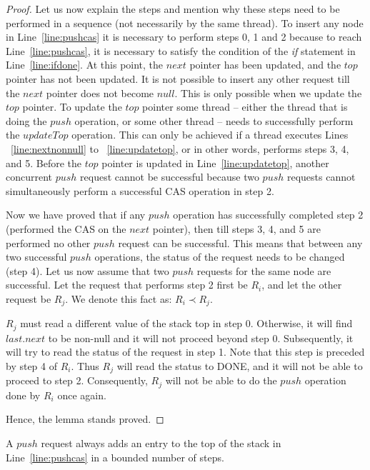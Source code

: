 \documentclass{llncs}
\newcommand{\DONE}{{\scriptsize{DONE}}\xspace}
\begin{document}
\begin{appendix}
\begin{proof}
Let us now explain the steps and mention why these steps need to be performed
in a sequence (not necessarily by the same thread). To insert any node in
Line~\ref{line:pushcas} it is necessary to perform steps 0, 1 and 2 because to
reach Line~\ref{line:pushcas}, it is necessary to satisfy the condition of the
{\em if} statement in Line~\ref{line:ifdone}.  At this point, the $next$
pointer has been updated, and the $top$ pointer has not been updated.  It is
not possible to insert any other request till the $next$ pointer does not
become $null$. This is only possible when we update the $top$ pointer. To
update the $top$ pointer some thread -- either the thread that is doing the
$push$ operation, or some other thread --  needs to successfully perform the
$updateTop$ operation. This can only be achieved if a thread executes Lines
~\ref{line:nextnonnull} to ~\ref{line:updatetop}, or in other words, performs steps 3, 4,
and 5. Before the $top$ pointer is updated in Line~\ref{line:updatetop},
another concurrent $push$ request cannot be successful because two $push$
requests cannot simultaneously perform a successful CAS operation in step 2.  

Now we have proved that if any $push$ operation has successfully completed step
2 (performed the CAS on the $next$ pointer), then till steps 3, 4, and 5 are
performed no other $push$ request can be successful. This means that between
any two successful $push$ operations, the status of the request needs to be
changed (step 4).  Let us now assume that two $push$ requests for the same node
are successful. Let the request that performs step 2 first be $R_i$, and let
the other request be $R_j$. We denote this fact as: $R_i \prec R_j$. 

$R_j$ must read a different value of the stack top in step 0. Otherwise, it
will find $last.next$ to be non-null and it will not proceed beyond step 0.
Subsequently, it will try to read the status of the request in step 1.  Note
that this step is preceded by step 4 of $R_i$. Thus $R_j$ will read the status
to \DONE, and it will not be able to proceed to step 2. Consequently, $R_j$
will not be able to do the $push$ operation done by $R_i$ once again. 

Hence, the lemma stands proved.
\end{proof}

\begin{lemma}
A $push$ request always adds an entry to the top of the stack in Line~\ref{line:pushcas} in
a bounded number of steps. 
\label{lemm:atleast}
\end{lemma}


\end{appendix}
\end{document}
